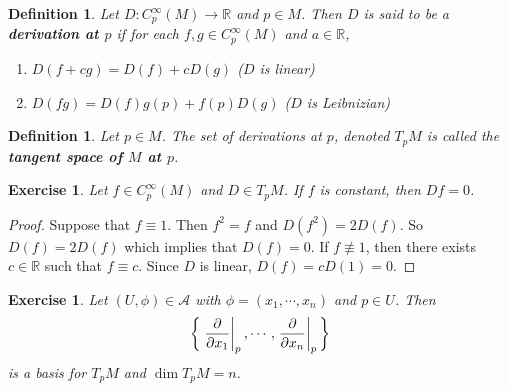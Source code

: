\documentclass[12pt]{amsart}
\newtheorem{defn}[thm]{Definition}
\newtheorem{ex}[thm]{Exercise}
\newcommand{\R}{\mathbb{R}}
\newcommand{\MA}{\mathcal{A}}
\begin{document}
	\begin{defn}
		Let $D: C^{\infty}_p(M) \rightarrow \R$ and $p \in M$. Then $D$ is said to be a \textbf{derivation at $p$} if for each $f, g \in C^{\infty}_p(M)$ and $a \in \R$,
		\begin{enumerate}
			\item $D(f + cg) = D(f) + c D(g)$ ($D$ is linear) 
			\item $D(fg) = D(f)g(p) + f(p)D(g)$ ($D$ is Leibnizian)
		\end{enumerate}
	\end{defn}

	\begin{defn}
		Let $p \in M$. The set of derivations at $p$, denoted $T_pM$ is called the \textbf{tangent space of $M$ at $p$}.
	\end{defn}

	\begin{ex}
		Let $f \in C^{\infty}_p(M)$ and $D \in T_pM$. If $f$ is constant, then $Df = 0$.
	\end{ex}

	\begin{proof}
		Suppose that $f \equiv 1$. Then $f^2 = f$ and $D(f^2) = 2D(f)$. So $D(f) = 2D(f)$ which implies that $D(f) = 0$. If $f \not \equiv 1$, then there exists $c \in \R$ such that $f \equiv c$. Since $D$ is linear, $D(f) = cD(1) = 0$.
	\end{proof}
	

	\begin{ex}
		Let $(U, \phi) \in \MA$ with $\phi = (x_1, \cdots, x_n)$ and $p \in U$. Then $$ \bigg \{\eval{\pdv{x_1}}_{p}, \cdots, \eval{\pdv{x_n}}_{p} \bigg \}$$ is a basis for $T_pM$ and $\dim T_pM = n$.
	\end{ex}
\end{document}
